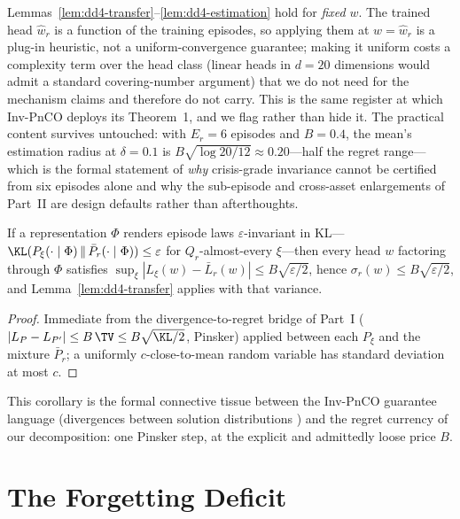 \begin{warning}[title={Important: the plug-in caveat}]
Lemmas~\ref{lem:dd4-transfer}--\ref{lem:dd4-estimation} hold for
\emph{fixed} $w$. The trained head $\hat w_r$ is a function of the
training episodes, so applying them at $w = \hat w_r$ is a plug-in
heuristic, not a uniform-convergence guarantee; making it uniform costs
a complexity term over the head class (linear heads in $d = 20$
dimensions would admit a standard covering-number argument) that we do
not need for the mechanism claims and therefore do not carry. This is
the same register at which Inv-PnCO deploys its Theorem~1, and we flag
rather than hide it. The practical content survives untouched: with
$E_r = 6$ episodes and $B = 0.4$, the mean's estimation radius at
$\delta = 0.1$ is $B\sqrt{\log 20 / 12} \approx 0.20$---half the regret
range---which is the formal statement of \emph{why} crisis-grade
invariance cannot be certified from six episodes alone and why the
sub-episode and cross-asset enlargements of Part~II are design defaults
rather than afterthoughts.
\end{warning}

\begin{corollary}
\label{cor:dd4-bridge}
If a representation $\Phi$ renders episode laws $\varepsilon$-invariant
in KL---$\KL(P_\xi(\cdot \mid \Phi)\, \|\, \bar P_r(\cdot \mid \Phi))
\le \varepsilon$ for $Q_r$-almost-every $\xi$---then every head $w$
factoring through $\Phi$ satisfies
$\sup_\xi |L_\xi(w) - \bar L_r(w)| \le B\sqrt{\varepsilon/2}$, hence
$\sigma_r(w) \le B\sqrt{\varepsilon/2}$, and
Lemma~\ref{lem:dd4-transfer} applies with that variance.
\end{corollary}

\begin{proof}
Immediate from the divergence-to-regret bridge of Part~I
($|L_P - L_{P'}| \le B\,\TV \le B\sqrt{\KL/2}$, Pinsker) applied
between each $P_\xi$ and the mixture $\bar P_r$; a uniformly
$c$-close-to-mean random variable has standard deviation at most $c$.
\end{proof}

This corollary is the formal connective tissue between the Inv-PnCO
guarantee language (divergences between solution distributions
\cite{yan2026invpnco}) and the regret currency of our decomposition: one
Pinsker step, at the explicit and admittedly loose price $B$.

\section{The Forgetting Deficit}
\label{sec:dd4-forget}

